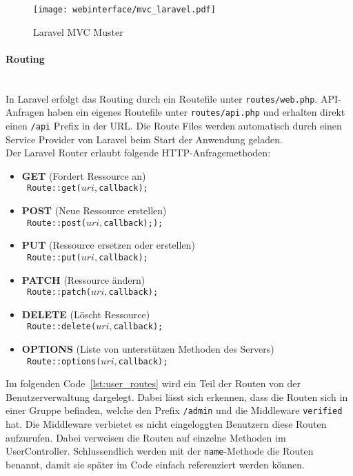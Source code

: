 \begin{figure}[H]
  \centering
  \texttt{[image: webinterface/mvc\_laravel.pdf]}
  \caption{Laravel MVC Muster}
\end{figure}

\paragraph{Routing}\mbox{}\\
In Laravel erfolgt das Routing durch ein Routefile unter \verb|routes/web.php|. API-Anfragen
haben ein eigenes Routefile unter \verb|routes/api.php| und erhalten direkt einen
\verb|/api| Prefix in der URL. Die Route Files werden automatisch durch einen
Service Provider von Laravel beim Start der Anwendung geladen.\\

Der Laravel Router erlaubt folgende HTTP-Anfragemethoden:
\begin{itemize}
  \item \textbf{GET} (Fordert Ressource an)\\
  \texttt{  Route::get($uri, $callback);}
  \item \textbf{POST} (Neue Ressource erstellen)\\
  \texttt{  Route::post($uri, $callback););}
  \item \textbf{PUT} (Ressource ersetzen oder erstellen)\\
  \texttt{  Route::put($uri, $callback);}
  \item \textbf{PATCH} (Ressource ändern)\\
  \texttt{  Route::patch($uri, $callback);}
  \item \textbf{DELETE} (Löscht Ressource)\\
  \texttt{  Route::delete($uri, $callback);}
  \item \textbf{OPTIONS} (Liste von unterstützen Methoden des Servers)\\
  \texttt{  Route::options($uri, $callback);}
\end{itemize}

Im folgenden Code~\ref{lst:user_routes} wird ein Teil der Routen von der
Benutzerverwaltung dargelegt. Dabei lässt sich erkennen, dass die Routen sich in
einer Gruppe befinden, welche den Prefix \verb|/admin| und die Middleware
\verb|verified| hat. Die Middleware verbietet es nicht eingeloggten Benutzern
diese Routen aufzurufen. Dabei verweisen die Routen auf einzelne Methoden im
UserController. Schlussendlich werden mit der \verb|name|-Methode die Routen benannt,
damit sie später im Code einfach referenziert werden können.

